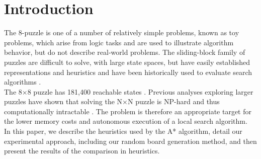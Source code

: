 
\section{Introduction}
\label{sec:intro}

The 8-puzzle is one of a number of relatively simple problems, known as toy problems, which arise from logic tasks and are used to illustrate algorithm behavior, but do not describe real-world problems. The sliding-block family of puzzles are difficult to solve, with large state spaces, but have easily established representations and heuristics and have been historically used to evaluate search algorithms \cite{intractable}. \\

The 8$\times$8 puzzle has 181,400 reachable states \cite{aima}.  Previous analyses exploring larger puzzles have shown that solving the N$\times$N puzzle is NP-hard and thus computationally intractable \cite{intractable}.  The problem is therefore an appropriate target for the lower memory costs and autonomous execution of a local search algorithm. \\

In this paper, we describe the heuristics used by the A* algorithm, detail our experimental approach, including our random board generation method, and then present the results of the comparison in heuristics.





